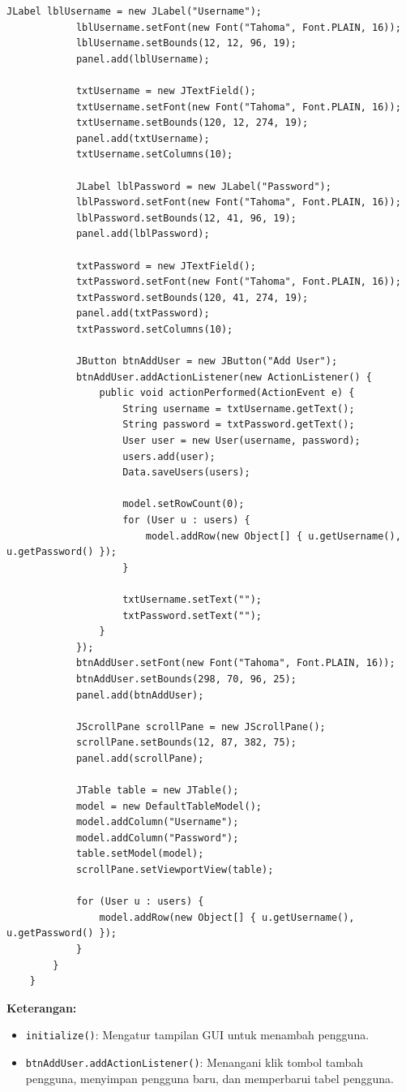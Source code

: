 \begin{lstlisting}[style=JavaStyle]
			JLabel lblUsername = new JLabel("Username");
			lblUsername.setFont(new Font("Tahoma", Font.PLAIN, 16));
			lblUsername.setBounds(12, 12, 96, 19);
			panel.add(lblUsername);
			
			txtUsername = new JTextField();
			txtUsername.setFont(new Font("Tahoma", Font.PLAIN, 16));
			txtUsername.setBounds(120, 12, 274, 19);
			panel.add(txtUsername);
			txtUsername.setColumns(10);
			
			JLabel lblPassword = new JLabel("Password");
			lblPassword.setFont(new Font("Tahoma", Font.PLAIN, 16));
			lblPassword.setBounds(12, 41, 96, 19);
			panel.add(lblPassword);
			
			txtPassword = new JTextField();
			txtPassword.setFont(new Font("Tahoma", Font.PLAIN, 16));
			txtPassword.setBounds(120, 41, 274, 19);
			panel.add(txtPassword);
			txtPassword.setColumns(10);
			
			JButton btnAddUser = new JButton("Add User");
			btnAddUser.addActionListener(new ActionListener() {
				public void actionPerformed(ActionEvent e) {
					String username = txtUsername.getText();
					String password = txtPassword.getText();
					User user = new User(username, password);
					users.add(user);
					Data.saveUsers(users);
					
					model.setRowCount(0);
					for (User u : users) {
						model.addRow(new Object[] { u.getUsername(), u.getPassword() });
					}
					
					txtUsername.setText("");
					txtPassword.setText("");
				}
			});
			btnAddUser.setFont(new Font("Tahoma", Font.PLAIN, 16));
			btnAddUser.setBounds(298, 70, 96, 25);
			panel.add(btnAddUser);
			
			JScrollPane scrollPane = new JScrollPane();
			scrollPane.setBounds(12, 87, 382, 75);
			panel.add(scrollPane);
			
			JTable table = new JTable();
			model = new DefaultTableModel();
			model.addColumn("Username");
			model.addColumn("Password");
			table.setModel(model);
			scrollPane.setViewportView(table);
			
			for (User u : users) {
				model.addRow(new Object[] { u.getUsername(), u.getPassword() });
			}
		}
	}
\end{lstlisting}

\textbf{Keterangan:} 
\begin{itemize}
	\item \texttt{initialize()}: Mengatur tampilan GUI untuk menambah pengguna.
	\item \texttt{btnAddUser.addActionListener()}: Menangani klik tombol tambah pengguna, menyimpan pengguna baru, dan memperbarui tabel pengguna.
\end{itemize}

